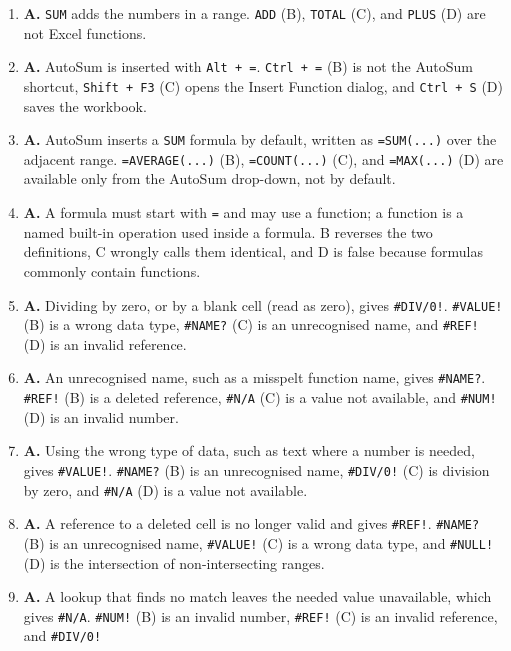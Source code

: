 \documentclass[11pt]{article}
\begin{document}
\begin{enumerate}[label=\textbf{Q\arabic*.}, leftmargin=*]
  \texttt{MAX} (B) returns the largest, and \texttt{MINIMUM} (C) and
  \texttt{LEAST} (D) are not Excel functions.
\item \textbf{A.} \texttt{SUM} adds the numbers in a range. \texttt{ADD} (B),
  \texttt{TOTAL} (C), and \texttt{PLUS} (D) are not Excel functions.
\item \textbf{A.} AutoSum is inserted with \texttt{Alt + =}. \texttt{Ctrl + =}
  (B) is not the AutoSum shortcut, \texttt{Shift + F3} (C) opens the Insert
  Function dialog, and \texttt{Ctrl + S} (D) saves the workbook.
\item \textbf{A.} AutoSum inserts a \texttt{SUM} formula by default, written
  as \texttt{=SUM(...)} over the adjacent range. \texttt{=AVERAGE(...)} (B),
  \texttt{=COUNT(...)} (C), and \texttt{=MAX(...)} (D) are available only from
  the AutoSum drop-down, not by default.
\item \textbf{A.} A formula must start with \texttt{=} and may use a function;
  a function is a named built-in operation used inside a formula. B reverses
  the two definitions, C wrongly calls them identical, and D is false because
  formulas commonly contain functions.
\item \textbf{A.} Dividing by zero, or by a blank cell (read as zero), gives
  \texttt{\#DIV/0!}. \texttt{\#VALUE!} (B) is a wrong data type,
  \texttt{\#NAME?} (C) is an unrecognised name, and \texttt{\#REF!} (D) is an
  invalid reference.
\item \textbf{A.} An unrecognised name, such as a misspelt function name,
  gives \texttt{\#NAME?}. \texttt{\#REF!} (B) is a deleted reference,
  \texttt{\#N/A} (C) is a value not available, and \texttt{\#NUM!} (D) is an
  invalid number.
\item \textbf{A.} Using the wrong type of data, such as text where a number is
  needed, gives \texttt{\#VALUE!}. \texttt{\#NAME?} (B) is an unrecognised
  name, \texttt{\#DIV/0!} (C) is division by zero, and \texttt{\#N/A} (D) is a
  value not available.
\item \textbf{A.} A reference to a deleted cell is no longer valid and gives
  \texttt{\#REF!}. \texttt{\#NAME?} (B) is an unrecognised name,
  \texttt{\#VALUE!} (C) is a wrong data type, and \texttt{\#NULL!} (D) is the
  intersection of non-intersecting ranges.
\item \textbf{A.} A lookup that finds no match leaves the needed value
  unavailable, which gives \texttt{\#N/A}. \texttt{\#NUM!} (B) is an invalid
  number, \texttt{\#REF!} (C) is an invalid reference, and \texttt{\#DIV/0!}

\end{enumerate}
\end{document}
